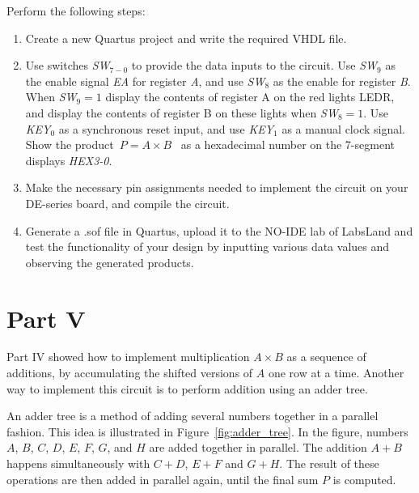 \documentclass[epsfig,10pt,fullpage]{article}
\begin{document}
Perform the following steps:
\begin{enumerate}
\item Create a new Quartus project and write the required VHDL file.
\item Use switches {\it SW}$_{7-0}$ to provide the data inputs to the circuit. Use
{\it SW}$_9$ as the enable signal {\it EA} for register {\it A}, and use {\it SW}$_8$
as the enable for register {\it B}.  When {\it SW}$_9 = 1$ display the contents of
register A on the red lights LEDR, and display the contents of register B on these lights
when {\it SW}$_8 = 1$. Use {\it KEY}$_0$ as a synchronous reset input, and use 
{\it KEY}$_1$ as a manual clock signal.  Show the product~$P = A \times B$~ as a
hexadecimal number on the 7-segment displays {\it HEX3-0}.
\item Make the necessary pin assignments needed to implement the circuit on your
DE-series board, and compile the circuit.
\item Generate a .sof file in Quartus, upload it to the NO-IDE lab of LabsLand and test the functionality of your design by inputting various data values and observing
the generated products.
\end{enumerate}

\section*{Part V}
Part IV showed how to implement multiplication $A \times B$ as a sequence of additions, 
by accumulating the shifted versions of $A$ one row at a time. Another way to implement 
this circuit is to perform addition using an adder tree.

An adder tree is a method of adding several numbers together in a parallel fashion. This 
idea is illustrated in Figure~\ref{fig:adder_tree}. In the figure, numbers 
$A$, $B$, $C$, $D$, $E$, $F$, $G$, and $H$ are added together in parallel.
The addition $A + B$ happens simultaneously with $C + D$, $E + F$ and $G + H$. The 
result of these operations are then added in parallel
again, until the final sum $P$ is computed.
\end{document}
